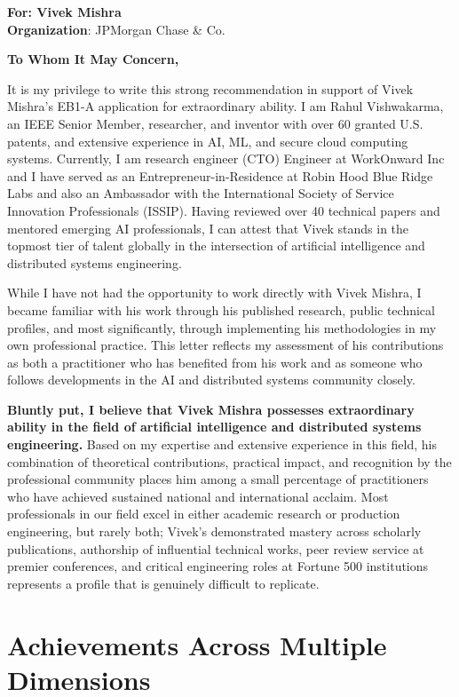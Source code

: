 \documentclass[11pt]{article}
\begin{document}
\noindent
\textbf{For: Vivek Mishra}\\
\textbf{Organization}: JPMorgan Chase \& Co.

\vspace{12pt}

\noindent
\textbf{To Whom It May Concern,}

It is my privilege to write this strong recommendation in support of Vivek Mishra's EB1-A application for extraordinary ability. I am Rahul Vishwakarma, an IEEE Senior Member, researcher, and inventor with over 60 granted U.S. patents, and extensive experience in AI, ML, and secure cloud computing systems. Currently, I am research engineer (CTO) Engineer at WorkOnward Inc and I have served as an Entrepreneur-in-Residence at Robin Hood Blue Ridge Labs and also an Ambassador with the International Society of Service Innovation Professionals (ISSIP). Having reviewed over 40 technical papers and mentored emerging AI professionals, I can attest that Vivek stands in the topmost tier of talent globally in the intersection of artificial intelligence and distributed systems engineering.

While I have not had the opportunity to work directly with Vivek Mishra, I became familiar with his work through his published research, public technical profiles, and most significantly, through implementing his methodologies in my own professional practice. This letter reflects my assessment of his contributions as both a practitioner who has benefited from his work and as someone who follows developments in the AI and distributed systems community closely.

\textbf{Bluntly put, I believe that Vivek Mishra possesses extraordinary ability in the field of artificial intelligence and distributed systems engineering.} Based on my expertise and extensive experience in this field, his combination of theoretical contributions, practical impact, and recognition by the professional community places him among a small percentage of practitioners who have achieved sustained national and international acclaim. Most professionals in our field excel in either academic research or production engineering, but rarely both; Vivek's demonstrated mastery across scholarly publications, authorship of influential technical works, peer review service at premier conferences, and critical engineering roles at Fortune 500 institutions represents a profile that is genuinely difficult to replicate.

\section*{Achievements Across Multiple Dimensions}
\end{document}
